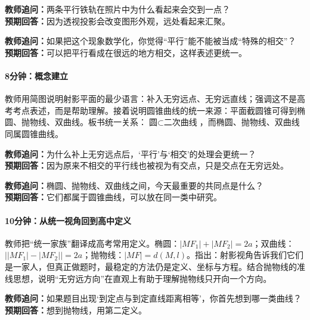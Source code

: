 \documentclass[UTF8,a4paper,11pt]{ctexart}
\begin{document}
\noindent\textbf{教师追问：}两条平行铁轨在照片中为什么看起来会交到一点？\\

\textbf{预期回答：}因为透视投影会改变图形外观，远处看起来汇聚。\par

\noindent\textbf{教师追问：}如果把这个现象数学化，你觉得“平行”能不能被当成“特殊的相交”？\\

\textbf{预期回答：}可以把平行看成在很远的地方相交，这样表述更统一。\par

\paragraph{8分钟：概念建立}

教师用简图说明射影平面的最少语言：补入无穷远点、无穷远直线；强调这不是高考考点表述，而是帮助理解。接着说明圆锥曲线的统一来源：平面截圆锥可得到椭圆、抛物线、双曲线。板书统一关系：$\text{圆}\subset\text{二次曲线}$，而椭圆、抛物线、双曲线同属圆锥曲线。

\noindent\textbf{教师追问：}为什么补上无穷远点后，‘平行’与‘相交’的处理会更统一？\\

\textbf{预期回答：}因为原来不相交的平行线也被视为有交点，只是交点在无穷远处。\par

\noindent\textbf{教师追问：}椭圆、抛物线、双曲线之间，今天最重要的共同点是什么？\\

\textbf{预期回答：}它们都属于圆锥曲线，可以放在同一类中研究。\par

\paragraph{10分钟：从统一视角回到高中定义}

教师把“统一家族”翻译成高考常用定义。椭圆：$|MF_1|+|MF_2|=2a$；双曲线：$\bigl||MF_1|-|MF_2|\bigr|=2a$；抛物线：$|MF|=d(M,l)$。指出：射影视角告诉我们它们是一家人，但真正做题时，最稳定的方法仍是定义、坐标与方程。结合抛物线的准线思想，说明“无穷远方向”在直观上有助于理解抛物线只开向一个方向。

\noindent\textbf{教师追问：}如果题目出现‘到定点与到定直线距离相等’，你首先想到哪一类曲线？\\

\textbf{预期回答：}想到抛物线，用第二定义。\par
\end{document}
